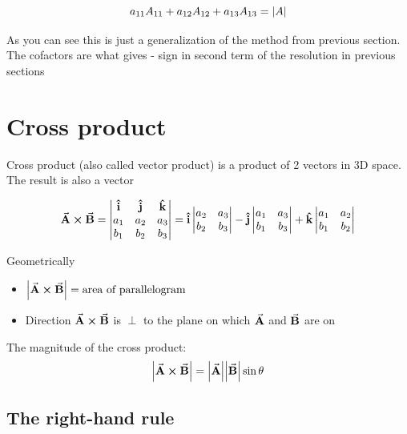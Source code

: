 \documentclass{article}
\begin{document}
    \[ a_{11}A_{11} + a_{12}A_{12} + a_{13}A_{13} = \abs{A} \]

    As you can see this is just a generalization of the method from previous section. The cofactors are what gives - sign in second term of the resolution in previous sections

    \section{Cross product}

    Cross product (also called vector product) is a product of 2 vectors in 3D space. The result is also a vector

    \begin{definition}
        \begin{align}
            \va{A}\cross\va{B}
            =\mdet{
            \vu{i} & \vu{j} & \vu{k}\\
            a_1 & a_2 & a_3 \\
            b_1 & b_2 & b_3
            }
            =\vu{i}\mdet{a_2 & a_3 \\ b_2 & b_3}
            -\vu{j}\mdet{a_1 & a_3 \\ b_1 & b_3}
            +\vu{k}\mdet{a_1 & a_2 \\ b_1 & b_2}
        \end{align}
    \end{definition}

    \begin{theorem}
        Geometrically
        \begin{itemize}
            \item $\abs{\va{A} \cross \va{B}}=\text{area of parallelogram}$
            \item Direction $\va{A} \cross \va{B}$ is $\perp$ to the plane on which $\va{A}$ and $\va{B}$ are on
        \end{itemize}
    \end{theorem}

    \begin{theorem}
        The magnitude of the cross product:
        \begin{align}
            \abs{\va{A} \cross \va{B}} = \abs{\va{A}}\abs{\va{B}}\sin{\theta}
        \end{align}
    \end{theorem}

    \subsection{The right-hand rule}
\end{document}
